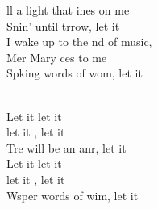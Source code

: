 \begin{cancion}
	ll a light that ines on me\\
	Snin' until trrow, let it  \\
	I wake up to the nd of music, \\
	Mer Mary ces to me\\
	Spking words of wom, let it  \\\jump\\
	\begin{chorus}%
	Let it  let it \\
	let it , let it \\
	Tre will be an anr, let it \\
	Let it  let it \\
	let it , let it \\
	Wsper words of wim, let it \\
	\end{chorus}%
	\jump\\
\end{cancion}%
